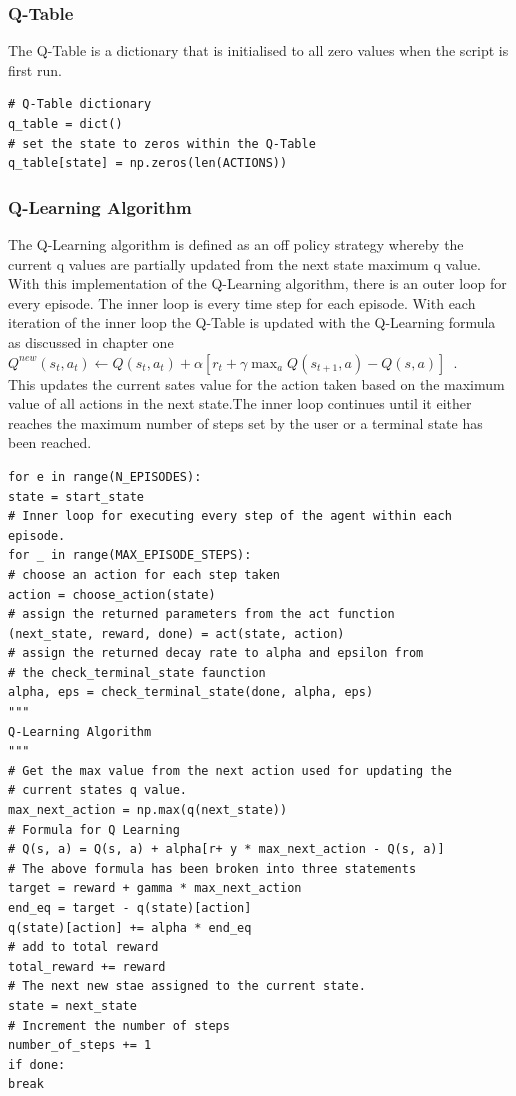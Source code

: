 \subsubsection{Q-Table}
The Q-Table is a dictionary that is initialised to all zero values when the script is first run.
\begin{verbatim}
# Q-Table dictionary
q_table = dict()
# set the state to zeros within the Q-Table
q_table[state] = np.zeros(len(ACTIONS))

\end{verbatim}
\subsubsection{Q-Learning Algorithm}
The Q-Learning algorithm is defined as an off policy strategy whereby the current q values are partially updated from the next state maximum q value.
With this implementation of the Q-Learning algorithm, there is an outer loop for every episode.
The inner loop is every time step for each episode.
With each iteration of the inner loop the Q-Table is updated with the Q-Learning formula~\cite{LITTMAN1994157} as discussed in chapter one\\
$Q^{new}(s_{t},a_{t})\leftarrow Q(s_{t},a_{t}) + \alpha[r_{t} + \gamma  \max _{a}Q(s_{t+1},a) - Q(s, a)]$~\cite{Qlearnin52:online}.\\ This updates the current sates value for the action taken based on the maximum value of all actions in the next state.The inner loop continues until it either reaches the maximum number of steps set by the user or a terminal state has been reached.
\begin{verbatim}
for e in range(N_EPISODES):
state = start_state
# Inner loop for executing every step of the agent within each episode.
for _ in range(MAX_EPISODE_STEPS):
# choose an action for each step taken
action = choose_action(state)
# assign the returned parameters from the act function
(next_state, reward, done) = act(state, action)
# assign the returned decay rate to alpha and epsilon from
# the check_terminal_state faunction
alpha, eps = check_terminal_state(done, alpha, eps)
"""
Q-Learning Algorithm
"""
# Get the max value from the next action used for updating the
# current states q value.
max_next_action = np.max(q(next_state))
# Formula for Q Learning
# Q(s, a) = Q(s, a) + alpha[r+ y * max_next_action - Q(s, a)]
# The above formula has been broken into three statements
target = reward + gamma * max_next_action
end_eq = target - q(state)[action]
q(state)[action] += alpha * end_eq
# add to total reward
total_reward += reward
# The next new stae assigned to the current state.
state = next_state
# Increment the number of steps
number_of_steps += 1
if done:
break


\end{verbatim}
